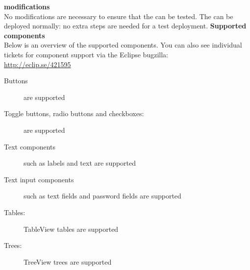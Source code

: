 \textbf{\gdaut{} modifications}\\
No modifications are necessary to ensure that the \gdaut{} can be tested. The \gdaut{} can be deployed normally: no extra steps are needed for a test deployment.
\textbf{Supported components}\\
Below is an overview of the supported components. You can also see individual tickets for component support via the Eclipse bugzilla:\\
\url{http://eclip.se/421595}
\begin{description}
\item [Buttons]{are supported}
\item [Toggle buttons, radio buttons and checkboxes:]{are supported}
\item [Text components]{such as labels and text are supported}
\item [Text input components]{such as text fields and password fields are supported}
\item [Tables:]{TableView tables are supported}
\item [Trees:]{TreeView trees are supported}
\end{description}
